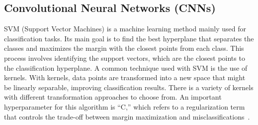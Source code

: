 \subsection{Convolutional Neural Networks (CNNs)}

SVM (Support Vector Machines) is a machine learning method mainly used for classification tasks. Its main goal is to find the best hyperplane that separates the classes and maximizes the margin with the closest points from each class. This process involves identifying the support vectors, which are the closest points to the classification hyperplane. A common technique used with SVM is the use of kernels. With kernels, data points are transformed into a new space that might be linearly separable, improving classification results. There is a variety of kernels with different transformation approaches to choose from. An important hyperparameter for this algorithm is “C,” which refers to a regularization term that controls the trade-off between margin maximization and misclassifications~\cite{geeksforgeeks_svm}.
